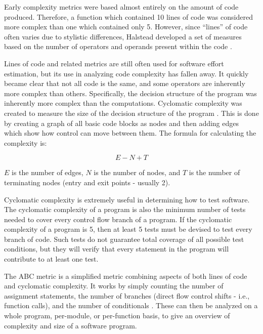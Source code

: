 Early complexity metrics were based almost entirely on the amount of code produced.  Therefore, a function which contained 10 lines of code was considered more complex than one which contained only 5.  However, since ``lines'' of code often varies due to stylistic differences, Halstead developed a set of measures based on the number of operators and operands present within the code \citep*{kearney}.

Lines of code and related metrics are still often used for software effort estimation, but its use in analyzing code complexity has fallen away.  It quickly became clear that not all code is the same, and some operators are inherently more complex than others.  Specifically, the decision structure of the program was inherently more complex than the computations.  Cyclomatic complexity was created to measure the size of the decision structure of the program \citep{mccabe}.  This is done by creating a graph of all basic code blocks as nodes and then adding edges which show how control can move between them.  The formula for calculating the complexity is:

\begin{equation}
E - N + T
\end{equation}

$E$ is the number of edges, $N$ is the number of nodes, and $T$ is the number of terminating nodes (entry and exit points - usually 2).   

Cyclomatic complexity is extremely useful in determining how to test software.  The cyclomatic complexity of a program is also the minimum number of tests needed to cover every control flow branch of a program.  If the cyclomatic complexity of a program is 5, then at least 5 tests must be devised to test every branch of code.  Such tests do not guarantee total coverage of all possible test conditions, but they will verify that every statement in the program will contribute to at least one test.

The ABC metric is a simplified metric combining aspects of both lines of code and cyclomatic complexity.  It works by simply counting the number of assignment statements, the number of branches (direct flow control shifts - i.e., function calls), and the number of conditionals \citep[pp.~2--3]{fitzpatrick}.  These can then be analyzed on a whole program, per-module, or per-function basis, to give an overview of complexity and size of a software program.

